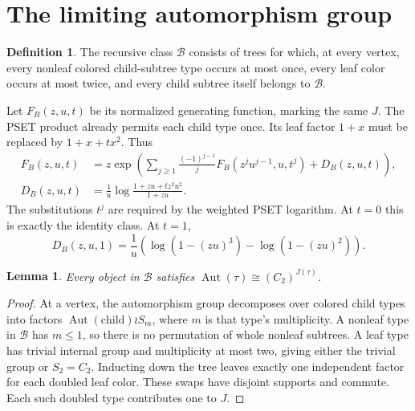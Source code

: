 \documentclass[11pt]{article}
\newtheorem{lemma}[theorem]{Lemma}
\theoremstyle{definition}
\newtheorem{definition}[theorem]{Definition}
\newcommand{\Aut}{\operatorname{Aut}}
\newcommand{\classB}{\mathcal B}
\begin{document}
\section{The limiting automorphism group}\label{mct:sec:group}
\begin{definition}
The recursive class $\classB$ consists of trees for which, at every vertex, every nonleaf colored child-subtree type occurs at most once, every leaf color occurs at most twice, and every child subtree itself belongs to $\classB$.
\end{definition}
Let $F_B(z,u,t)$ be its normalized generating function, marking the same $J$. The PSET product already permits each child type once. Its leaf factor $1+x$ must be replaced by $1+x+tx^2$. Thus
\begin{align}
 F_B(z,u,t)&=z\exp\left(\sum_{j\ge1}\frac{(-1)^{j-1}}j
 F_B(z^ju^{j-1},u,t^j)+D_B(z,u,t)\right),\label{mct:eq:B}\\
 D_B(z,u,t)&=\frac1u\log\frac{1+zu+tz^2u^2}{1+zu}.
\end{align}
The substitutions $t^j$ are required by the weighted PSET logarithm. At $t=0$ this is exactly the identity class. At $t=1$,
\begin{equation}\label{mct:eq:Bleaf}
 D_B(z,u,1)=\frac1u\left(\log(1-(zu)^3)-\log(1-(zu)^2)\right).
\end{equation}

\begin{lemma}\label{mct:lem:Bgroup}
Every object in $\classB$ satisfies $\Aut(\tau)\cong(C_2)^{J(\tau)}$.
\end{lemma}
\begin{proof}
At a vertex, the automorphism group decomposes over colored child types into factors $\Aut(\text{child})\wr S_m$, where $m$ is that type's multiplicity. A nonleaf type in $\classB$ has $m\le1$, so there is no permutation of whole nonleaf subtrees. A leaf type has trivial internal group and multiplicity at most two, giving either the trivial group or $S_2=C_2$. Inducting down the tree leaves exactly one independent factor for each doubled leaf color. These swaps have disjoint supports and commute. Each such doubled type contributes one to $J$.
\end{proof}
\end{document}

